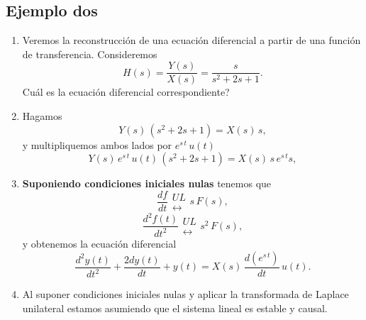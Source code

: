\subsection{Ejemplo dos}

\begin{enumerate}
\item Veremos la reconstrucci\'{o}n de una ecuaci\'{o}n diferencial a partir de una funci\'{o}n de 
transferencia. Consideremos 
\begin{equation}
        H\left( s\right) = \frac{Y(s)}{X(s)}=\frac{s}{s^{2}+2s+1}.
\end{equation}
\textquestiondown Cu\'{a}l es la ecuaci\'{o}n diferencial correspondiente?

\item Hagamos 
\begin{equation}
        Y(s) \, \left( s^{2}+2s+1\right) =X(s) \, s,
\end{equation}
y multipliquemos ambos lados por $e^{s \, t} \, u(t)$%
\begin{equation}
        Y(s) \, e^{s\, t} \, u(t) \, \left( s^{2}+2s+1\right) =X(s) \, s \, e^{s \, t}s,
\end{equation}

\item \textbf{Suponiendo condiciones iniciales nulas} tenemos que
\begin{equation}
  \frac{df}{dt} \begin{array}{c} UL \\ \leftrightarrow \end{array} s \, F(s),
\end{equation}
\begin{equation}
  \frac{d^{2}f(t)}{dt^{2}} \begin{array}{c} UL \\ \leftrightarrow \end{array} s^{2} \, F(s),
\end{equation}
y obtenemos la ecuaci\'{o}n diferencial 
\begin{equation}
        \frac{d^{2}y\left( t\right) }{dt^{2}}+\frac{2dy\left( t\right) }{dt}+y\left( t\right) = X(s) \, \frac{d(e^{s\,t})}{dt} \, u(t).
\end{equation}

\item Al suponer condiciones iniciales nulas y aplicar la transformada de Laplace unilateral estamos asumiendo que el sistema lineal es estable y causal.

\end{enumerate}

